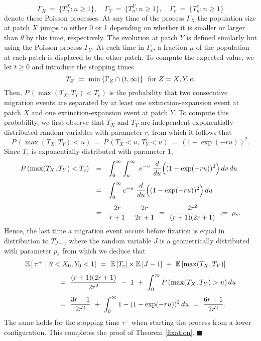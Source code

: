  $$ \Gamma_X \ = \ \{T_n^X : n \geq 1 \}, \quad
    \Gamma_Y \ = \ \{T_n^Y : n \geq 1 \}, \quad
    \Gamma_e \ = \ \{T_n^e : n \geq 1 \} $$
 denote these Poisson processes.
 At any time of the process $\Gamma_X$ the population size at patch $X$ jumps to either 0 or 1 depending on whether it is
 smaller or larger than $\theta$ by this time, respectively.
 The evolution at patch $Y$ is defined similarly but using the Poisson process $\Gamma_Y$.
 At each time in $\Gamma_e$, a fraction $\mu$ of the population at each patch is displaced to the other patch.
 To compute the expected value, we let $t \geq 0$ and introduce the stopping times
 $$ T_Z \ = \ \min \,\{\Gamma_Z \cap (t, \infty) \} \ \ \hbox{for} \ Z = X, Y, e. $$
 Then, $P \,(\max (T_X, T_Y) < T_e)$ is the probability that two consecutive migration events are separated by at least one
 extinction-expansion event at patch $X$ and one extinction-expansion event at patch $Y$.
 To compute this probability, we first observe that $T_X$ and $T_Y$ are independent exponentially distributed random variables
 with parameter $r$, from which it follows that
 $$ P \,(\max (T_X, T_Y) < u) \ = \ P \,(T_X < u, \,T_Y < u) \ = \ (1 - \exp (-ru))^2. $$
 Since $T_e$ is exponentially distributed with parameter 1,
 $$ \begin{array}{rcl}
  P \,(\max (T_X, T_Y) < T_e) & = &
    \displaystyle \int_0^{\infty} \int_u^{\infty} \ e^{-v} \ \frac{d}{du} \Big((1 - \exp (-ru))^2 \Big) \,dv \,du \vspace{8pt} \\ & = &
    \displaystyle \int_0^{\infty} e^{-u} \ \frac{d}{du} \Big((1 - \exp (-ru))^2 \Big) \,du \vspace{8pt} \\ & = &
    \displaystyle \frac{2r}{r + 1} - \frac{2r}{2r + 1} \ = \ \frac{2r^2}{(r + 1)(2r + 1)} \ := \ p_s. \end{array} $$
 Hence, the last time a migration event occurs before fixation is equal in distribution to $T_{J - 1}^e$ where the random variable $J$
 is a geometrically distributed with parameter $p_s$ from which we deduce that
 $$ \begin{array}{l}
    {\mathbb{E}} \,[\,\tau^+ \ | \ \theta < X_0, Y_0 < 1] \ = \ {\mathbb{E}} \,[T_e] \times {\mathbb{E}} \,[J - 1] \ + \ {\mathbb{E}} \,[\max (T_X, T_Y)] \vspace{8pt} \\
    \hspace{50pt} = \ \displaystyle \frac{(r + 1)(2r + 1)}{2r^2} \ - \ 1 \ + \ \int_0^{\infty} P \,(\max (T_X, T_Y) > u) \,du \vspace{8pt} \\
    \hspace{50pt} = \ \displaystyle \frac{3r + 1}{2r^2} \ + \ \int_0^{\infty} 1 - (1 - \exp (-ru))^2 \,du \ = \
    \frac{6r + 1}{2r^2}. \end{array} $$
 The same holds for the stopping time $\tau^-$ when starting the process from a lower configuration.
 This completes the proof of Theorem \ref{fixation}. \hspace{2mm} $\blacksquare$


